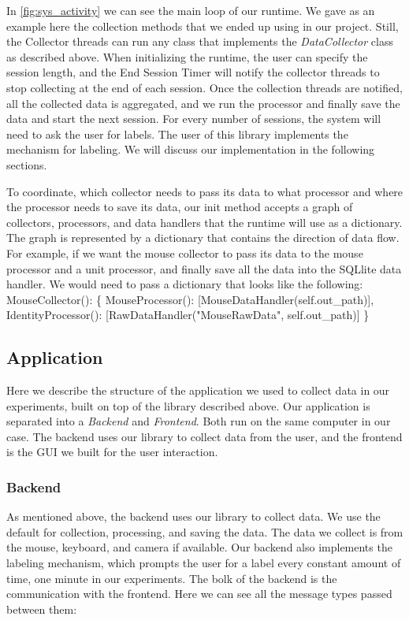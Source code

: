 \documentclass[../main.tex]{subfiles}
\begin{document}
\begin{itemize}
    In \ref{fig:sys_activity} we can see the main loop of our runtime. We gave as an example here the collection methods that we ended up using in 
    our project. Still, the Collector threads can run any class that implements the \textit{DataCollector} class as described above. 
    When initializing the runtime, the user can specify the session length, and the End Session Timer will notify the collector threads to 
    stop collecting at the end of each session. Once the collection threads are notified, all the collected data is aggregated, and we run the 
    processor and finally save the data and start the next session. For every number of sessions, the system will need to ask the user for labels. 
    The user of this library implements the mechanism for labeling. We will discuss our implementation in the following sections.


    To coordinate, which collector needs to pass its data to what processor and where the processor needs to save its data, 
    our init method accepts a graph of collectors, processors, and data handlers that the runtime will use as a dictionary. 
    The graph is represented by a dictionary that contains the direction of data flow. For example, 
    if we want the mouse collector to pass its data to the mouse processor and a unit processor, and finally save all the data into the SQLlite data handler. 
    We would need to pass a dictionary that looks like the following:
    MouseCollector(): \{ MouseProcessor(): [MouseDataHandler(self.out\_path)], IdentityProcessor(): [RawDataHandler("MouseRawData", self.out\_path)] \}

 \end{itemize}

\subsection{Application}


Here we describe the structure of the application we used to collect data in our experiments, built on top of the library described above. 
Our application is separated into a \textit{Backend} and \textit{Frontend}. Both run on the same computer in our case. 
The backend uses our library to collect data from the user, and the frontend is the GUI we built for the user interaction.

\subsubsection{Backend}
As mentioned above, the backend uses our library to collect data. We use the default for collection, processing, and saving the data. 
The data we collect is from the mouse, keyboard, and camera if available. Our backend also implements the labeling mechanism, 
which prompts the user for a label every constant amount of time, one minute in our experiments.
The bolk of the backend is the communication with the frontend. Here we can see all the message types passed between them:
\end{document}
